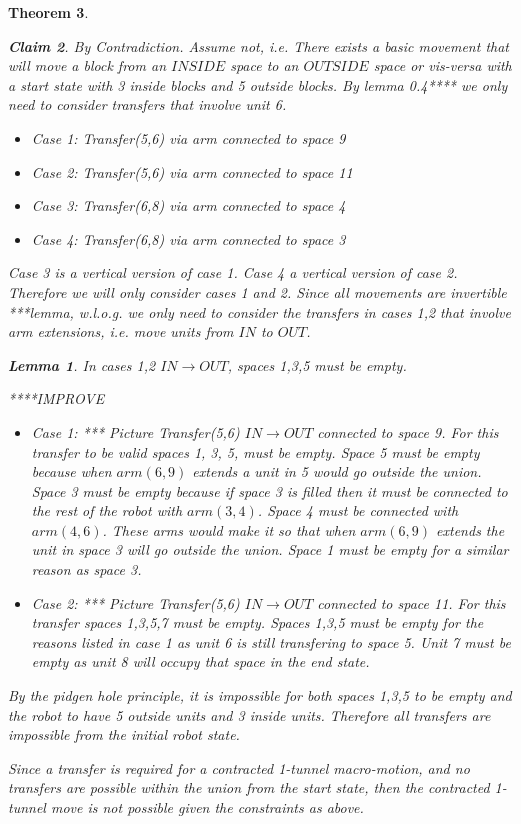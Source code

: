 \documentclass[12pt]{article}
\newtheorem{theorem}{Theorem}[section]
\newtheorem{claim}[theorem]{Claim}
\newtheorem{lemma}[theorem]{Lemma}
\newenvironment{proof}[1][Proof]{\begin{trivlist}
\item[\hskip \labelsep {\bfseries #1}]}{\end{trivlist}}
\begin{document}
\begin{theorem}
\begin{claim}
By Contradiction. Assume not, i.e. There exists a basic movement that will move a block from an $INSIDE$ space to an $OUTSIDE$ space or vis-versa with a start state with 3 inside blocks and 5 outside blocks. By lemma 0.4**** we only need to consider transfers that involve unit 6. 
\begin{itemize}
\item Case 1: Transfer(5,6) via arm connected to space 9
\item Case 2: Transfer(5,6) via arm connected to space 11
\item Case 3: Transfer(6,8) via arm connected to space 4
\item Case 4: Transfer(6,8) via arm connected to space 3
\end{itemize}
Case 3 is a vertical version of case 1. Case 4 a vertical version of case 2. Therefore we will only consider cases 1 and 2. Since all movements are invertible ***lemma, w.l.o.g. we only need to consider the transfers in cases 1,2 that involve arm extensions, i.e. move units from $IN$ to $OUT$.

\begin{lemma}
In cases 1,2 $IN \rightarrow OUT$, spaces 1,3,5 must be empty.
\end{lemma}
\begin{proof} ****IMPROVE
\begin{itemize}
\item Case 1: *** Picture Transfer(5,6) $IN \rightarrow OUT$ connected to space 9. For this transfer to be valid spaces 1, 3, 5, must be empty. Space 5 must be empty because when $arm(6,9)$ extends a unit in 5 would go outside the union. Space 3 must be empty because if space 3 is filled then it must be connected to the rest of the robot with $arm(3,4)$. Space 4 must be connected with $arm(4,6)$. These arms would make it so that when $arm(6,9)$ extends the unit in space 3 will go outside the union. Space 1 must be empty for a similar reason as space 3.
\item Case 2: *** Picture Transfer(5,6) $IN \rightarrow OUT$ connected to space 11. For this transfer spaces 1,3,5,7 must be empty. Spaces 1,3,5 must be empty for the reasons listed in case 1 as unit 6 is still transfering to space 5. Unit 7 must be empty as unit 8 will occupy that space in the end state. 
\end{itemize}
\end{proof}
By the pidgen hole principle, it is impossible for both spaces 1,3,5 to be empty and the robot to have 5 outside units and 3 inside units. Therefore all transfers are impossible from the initial robot state. 
\end{claim}
Since a transfer is required for a contracted 1-tunnel macro-motion, and no transfers are possible within the union from the start state, then the contracted 1-tunnel move is not possible given the constraints as above. 
\end{theorem}
\end{document}
